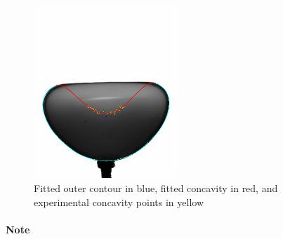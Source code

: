 
\begin{figure}[H] %
	\centering%
  \includegraphics[width=0.48\textwidth]{figures/Chapter_1/outer_contour_complete.png}
	\caption{Fitted outer contour in blue, fitted concavity in red, and experimental concavity points in yellow}
	\label{fig:fit_complet}
\end{figure}
\paragraph{Note}
\paragraph{}
\newpage

